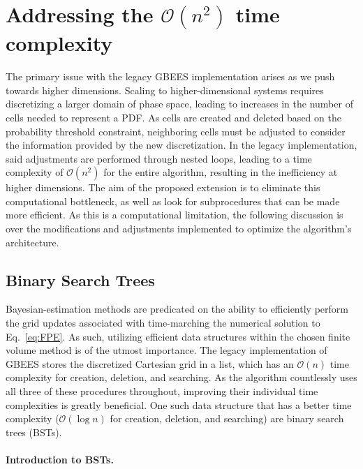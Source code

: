 \documentclass[paper,11pt]{AAS}
\begin{document}
\section{Addressing the $\mathcal{O}(n^2)$ time complexity}

The primary issue with the legacy GBEES implementation arises as we push towards higher dimensions. Scaling to higher-dimensional systems requires discretizing a larger domain of phase space, leading to increases in the number of cells needed to represent a PDF. As cells are created and deleted based on the probability threshold constraint, neighboring cells must be adjusted to consider the information provided by the new discretization. In the legacy implementation, said adjustments are performed through nested loops, leading to a time complexity of $\mathcal{O}(n^2)$ for the entire algorithm, resulting in the inefficiency at higher dimensions. The aim of the proposed extension is to eliminate this computational bottleneck, as well as look for subprocedures that can be made more efficient. As this is a computational limitation, the following discussion is over the modifications and adjustments implemented to optimize the algorithm's architecture.

\subsection{Binary Search Trees}

Bayesian-estimation methods are predicated on the ability to efficiently perform the grid updates associated with time-marching the numerical solution to Eq.~\eqref{eq:FPE}. As such, utilizing efficient data structures within the chosen finite volume method is of the utmost importance. The legacy implementation of GBEES stores the discretized Cartesian grid in a list, which has an $\mathcal{O}(n)$ time complexity for creation, deletion, and searching. As the algorithm countlessly uses all three of these procedures throughout, improving their individual time complexities is greatly beneficial. One such data structure that has a better time complexity ($\mathcal{O}(\log n)$ for creation, deletion, and searching) are binary search trees (BSTs). 

\paragraph{Introduction to BSTs.} 
\end{document}
